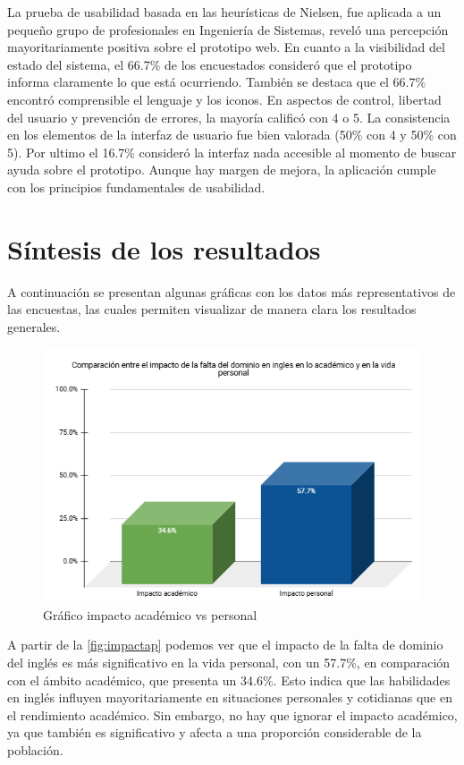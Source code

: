 La prueba de usabilidad basada en las heurísticas de Nielsen, fue aplicada a un pequeño grupo de profesionales en Ingeniería de Sistemas, reveló una percepción mayoritariamente positiva sobre el prototipo web. En cuanto a la visibilidad del estado del sistema, el 66.7\% de los encuestados consideró que el prototipo informa claramente lo que está ocurriendo. También se destaca que el 66.7\% encontró comprensible el lenguaje y los iconos. En aspectos de control, libertad del usuario y prevención de errores, la mayoría calificó con 4 o 5. La consistencia en los elementos de la interfaz de usuario fue bien valorada (50\% con 4 y 50\% con 5). Por ultimo el 16.7\% consideró la interfaz nada accesible al momento de buscar ayuda sobre el prototipo. Aunque hay margen de mejora, la aplicación cumple con los principios fundamentales de usabilidad.

\newpage
\section{Síntesis de los resultados}\label{sintesis}

A continuación se presentan algunas gráficas con los datos más representativos de las encuestas, las cuales permiten visualizar de manera clara los resultados generales.

\begin{figure}[H]
  \centering
  \includegraphics[width=0.8\linewidth]{Imagenes/Grafico impacto academico vs personal.png}
  \caption{Gráfico impacto académico vs personal}
  \label{fig:impactap}
\end{figure}

A partir de la \autoref{fig:impactap} podemos ver que el impacto de la falta de dominio del inglés es más significativo en la vida personal, con un 57.7\%, en comparación con el ámbito académico, que presenta un 34.6\%. Esto indica que las habilidades en inglés influyen mayoritariamente en situaciones personales y cotidianas que en el rendimiento académico. Sin embargo, no hay que ignorar el impacto académico, ya que también es significativo y afecta a una proporción considerable de la población.

